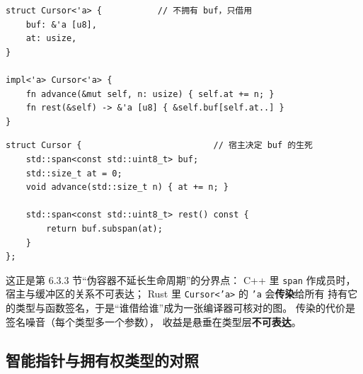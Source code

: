 \documentclass[12pt,a4paper,fontset=fandol]{ctexbook}
\begin{document}
\begin{lstlisting}[style=ruststyle,caption={Rust 的视图结构体：字段带区域名}]
struct Cursor<'a> {           // 不拥有 buf，只借用
    buf: &'a [u8],
    at: usize,
}

impl<'a> Cursor<'a> {
    fn advance(&mut self, n: usize) { self.at += n; }
    fn rest(&self) -> &'a [u8] { &self.buf[self.at..] }
}
\end{lstlisting}

\begin{lstlisting}[caption={C++ 的同型视图：编译器不记录 buf 借自谁}]
struct Cursor {                          // 宿主决定 buf 的生死
    std::span<const std::uint8_t> buf;
    std::size_t at = 0;
    void advance(std::size_t n) { at += n; }

    std::span<const std::uint8_t> rest() const {
        return buf.subspan(at);
    }
};
\end{lstlisting}

这正是第 6.3.3 节``伪容器不延长生命周期''的分界点：
C++ 里 \texttt{span} 作成员时，宿主与缓冲区的关系不可表达；
Rust 里 \texttt{Cursor<'a>} 的 \texttt{'a} 会\textbf{传染}给所有
持有它的类型与函数签名，于是``谁借给谁''成为一张编译器可核对的图。
传染的代价是签名噪音（每个类型多一个参数），
收益是悬垂在类型层\textbf{不可表达}。

\subsection{智能指针与拥有权类型的对照}
\end{document}
